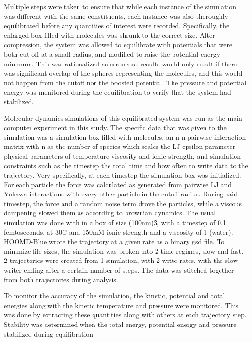 \documentclass{article}
\begin{document}
Multiple steps were taken to ensure that while each instance of the simulation was different with the same constituents, each instance was also thoroughly equilibrated before any quantities of interest were recorded. Specifically, the enlarged box filled with molecules was shrunk to the correct size. After compression, the system was allowed to equilibrate with potentials that were both cut off at a small radius, and modified to raise the potential energy minimum. This was rationalized as erroneous results would only result if there was significant overlap of the spheres representing the molecules, and this would not happen from the cutoff nor the boosted potential. The pressure and potential energy was monitored during the equilibration to verify that the system had stabilized.

Molecular dynamics simulations of this equilibrated system was run as the main computer experiment in this study. The specific data that was given to the simulation was a simulation box filled with molecules, an n-n pairwise interaction matrix with n as the number of species which scales the LJ epsilon parameter, physical parameters of temperature viscosity and ionic strength, and simulation constraints such as the timestep the total time and how often to write data to the trajectory. Very specifically, at each timestep the simulation box was initialized. For each particle the force was calculated as generated from pairwise LJ and Yukawa interactions with every other particle in the cutoff radius. During said timestep, the force and a random noise term drove the particles, while a viscous dampening slowed them as according to brownian dynamics. The usual simulation was done with in a box of size (100nm)\^3, with a timestep of 0.1 femtoseconds, at 30C and 150mM ionic strength and a viscosity of 1 (water). HOOMD-Blue wrote the trajectory at a given rate as a binary gsd file. To minimize file sizes, the simulation was broken into 2 time regimes, slow and fast. 2 trajectories were created from 1 simulation, with 2 write rates, with the slow writer ending after a certain number of steps. The data was stitched together from both trajectories during analysis.

To monitor the accuracy of the simulation, the kinetic, potential and total energies along with the kinetic temperature and pressure were monitored. This was done by extracting these quantities along with others at each trajectory step. Stability was determined when the total energy, potential energy and pressure stabilized during equilibration.
\end{document}
